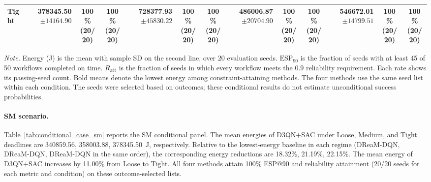 \begin{table}[!t]
\begin{tabular}{@{}l*{4}{rcc}@{}}
Tight & \shortstack[r]{\textbf{378345.50}\\$\pm 14164.90$} & \shortstack[c]{100\%\\(20/20)} & \shortstack[c]{100\%\\(20/20)} & \shortstack[r]{728377.93\\$\pm 45830.22$} & \shortstack[c]{100\%\\(20/20)} & \shortstack[c]{100\%\\(20/20)} & \shortstack[r]{486006.87\\$\pm 20704.90$} & \shortstack[c]{100\%\\(20/20)} & \shortstack[c]{100\%\\(20/20)} & \shortstack[r]{546672.01\\$\pm 14799.51$} & \shortstack[c]{100\%\\(20/20)} & \shortstack[c]{100\%\\(20/20)} \\
\bottomrule
\end{tabular}
\par\vspace{3pt}
\parbox{\textwidth}{\footnotesize
\textit{Note.} Energy (J) is the mean with sample SD on the second line, over 20 evaluation seeds.
$\mathrm{ESP}_{90}$ is the fraction of seeds with at least 45 of 50 workflows completed on time.
$R_{\mathrm{att}}$ is the fraction of seeds in which every workflow meets the 0.9 reliability requirement.
Each rate shows its passing-seed count. Bold means denote the lowest energy among constraint-attaining methods.
The four methods use the same seed list within each condition.
The seeds were selected based on outcomes; these conditional results do not estimate unconditional success probabilities.}
\endgroup
\end{table}

\paragraph{SM scenario.}
Table~\ref{tab:conditional_case_sm} reports the SM conditional panel. The mean energies of D3QN+SAC under Loose, Medium, and Tight deadlines are 340859.56, 358003.88, 378345.50~J, respectively. Relative to the lowest-energy baseline in each regime (DReaM-DQN, DReaM-DQN, DReaM-DQN in the same order), the corresponding energy reductions are 18.32\%, 21.19\%, 22.15\%. The mean energy of D3QN+SAC increases by 11.00\% from Loose to Tight. All four methods attain 100\% ESP@90 and reliability attainment (20/20 seeds for each metric and condition) on these outcome-selected lists.

